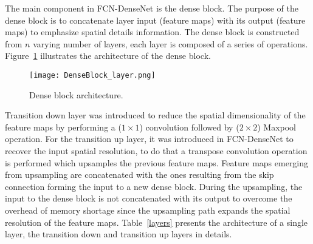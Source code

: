 The main component in FCN-DenseNet is the dense block.
The purpose of the dense block is to concatenate layer input (feature maps) with its output (feature maps) to emphasize spatial details information.
The dense block is constructed from \(n\) varying number of layers, each layer is composed of a series of operations.
Figure~\ref{dense_block} illustrates the architecture of the dense block.
\begin{figure} [h!]
	\begin{center}
		\texttt{[image: DenseBlock\_layer.png]}
	\end{center}
	\caption{Dense block architecture.} 
	\label{dense_block}
\end{figure}
Transition down layer was introduced to reduce the spatial dimensionality of the feature maps by performing a (\(1\times 1\)) convolution followed by (\(2\times2\)) Maxpool operation. 
For the transition up layer, it was introduced in FCN-DenseNet to recover the input spatial resolution, to do that a transpose convolution operation is performed which upsamples the previous feature maps.
Feature maps emerging from upsampling are concatenated with the ones resulting from the skip connection forming the input to a new dense block.
During the upsampling, the input to the dense block is not concatenated with its output to overcome the overhead of memory shortage since the upsampling path expands the spatial resolution of the feature maps.
Table~\ref{layers} presents the architecture of a single layer, the transition down  and transition up layers in details.
